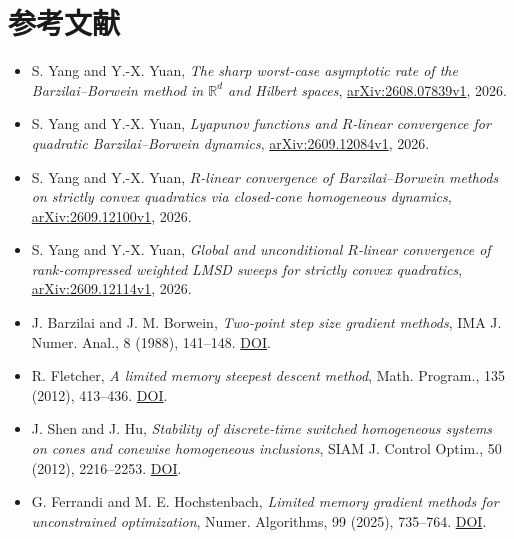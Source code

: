\documentclass[UTF8,zihao=-4,a4paper]{ctexart}
\newcommand{\R}{\mathbb R}
\begin{document}
\section*{参考文献}
\begin{itemize}
\item S. Yang and Y.-X. Yuan, \emph{The sharp worst-case asymptotic rate of the Barzilai--Borwein method in $\R^d$ and Hilbert spaces}, \href{https://arxiv.org/abs/2608.07839v1}{arXiv:2608.07839v1}, 2026.
\item S. Yang and Y.-X. Yuan, \emph{Lyapunov functions and $R$-linear convergence for quadratic Barzilai--Borwein dynamics}, \href{https://arxiv.org/abs/2609.12084v1}{arXiv:2609.12084v1}, 2026.
\item S. Yang and Y.-X. Yuan, \emph{$R$-linear convergence of Barzilai--Borwein methods on strictly convex quadratics via closed-cone homogeneous dynamics}, \href{https://arxiv.org/abs/2609.12100v1}{arXiv:2609.12100v1}, 2026.
\item S. Yang and Y.-X. Yuan, \emph{Global and unconditional $R$-linear convergence of rank-compressed weighted LMSD sweeps for strictly convex quadratics}, \href{https://arxiv.org/abs/2609.12114v1}{arXiv:2609.12114v1}, 2026.
\item J. Barzilai and J. M. Borwein, \emph{Two-point step size gradient methods}, IMA J. Numer. Anal., 8 (1988), 141--148. \href{https://doi.org/10.1093/imanum/8.1.141}{DOI}.
\item R. Fletcher, \emph{A limited memory steepest descent method}, Math. Program., 135 (2012), 413--436. \href{https://doi.org/10.1007/s10107-011-0479-6}{DOI}.
\item J. Shen and J. Hu, \emph{Stability of discrete-time switched homogeneous systems on cones and conewise homogeneous inclusions}, SIAM J. Control Optim., 50 (2012), 2216--2253. \href{https://doi.org/10.1137/110845215}{DOI}.
\item G. Ferrandi and M. E. Hochstenbach, \emph{Limited memory gradient methods for unconstrained optimization}, Numer. Algorithms, 99 (2025), 735--764. \href{https://doi.org/10.1007/s11075-024-01895-9}{DOI}.
\end{itemize}
\end{document}
